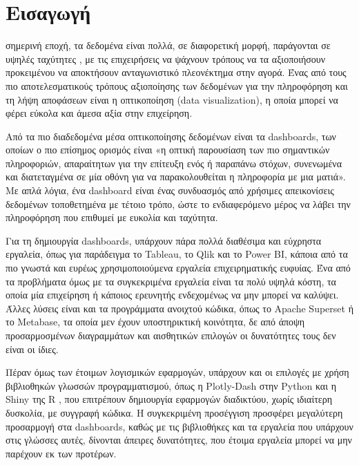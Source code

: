 \documentclass{article}
\begin{document}
\newpage


\section{Εισαγωγή}

 σημερινή εποχή, τα δεδομένα είναι πολλά, σε διαφορετική μορφή, παράγονται σε υψηλές ταχύτητες \cite{laney20013d}, με τις επιχειρήσεις να ψάχνουν τρόπους να τα αξιοποιήσουν προκειμένου να αποκτήσουν ανταγωνιστικό πλεονέκτημα στην αγορά. \cite{ranjan2021big} Ένας από τους πιο αποτελεσματικούς τρόπους αξιοποίησης των δεδομένων για την πληροφόρηση και τη λήψη αποφάσεων είναι η οπτικοποίηση (data visualization), η οποία μπορεί να φέρει εύκολα και άμεσα αξία στην επιχείρηση. \cite{qin2020making}

Από τα πιο διαδεδομένα μέσα οπτικοποίησης δεδομένων είναι τα dashboards, των οποίων ο πιο επίσημος ορισμός είναι «η οπτική παρουσίαση των πιο σημαντικών πληροφοριών, απαραίτητων για την επίτευξη ενός ή παραπάνω στόχων, συνενωμένα και διατεταγμένα σε μία οθόνη για να παρακολουθείται η πληροφορία με μια ματιά». \cite{few2007dashboard} Με απλά λόγια, ένα dashboard είναι ένας συνδυασμός από χρήσιμες απεικονίσεις δεδομένων τοποθετημένα με τέτοιο τρόπο, ώστε το ενδιαφερόμενο μέρος να λάβει την πληροφόρηση που επιθυμεί με ευκολία και ταχύτητα.

Για τη δημιουργία dashboards, υπάρχουν πάρα πολλά διαθέσιμα και εύχρηστα εργαλεία, όπως για παράδειγμα το Tableau, το Qlik και το Power BI, κάποια από τα πιο γνωστά και ευρέως χρησιμοποιούμενα εργαλεία επιχειρηματικής ευφυίας. Ένα από τα προβλήματα όμως με τα συγκεκριμένα εργαλεία είναι τα πολύ υψηλά κόστη, τα οποία μία επιχείρηση ή κάποιος ερευνητής ενδεχομένως να μην μπορεί να καλύψει. Άλλες λύσεις είναι και τα προγράμματα ανοιχτού κώδικα, όπως το Apache Superset ή το Metabase, τα οποία μεν έχουν υποστηρικτική κοινότητα, δε από άποψη προσαρμοσμένων διαγραμμάτων και αισθητικών επιλογών οι δυνατότητες τους δεν είναι οι ίδιες.

Πέραν όμως των έτοιμων λογισμικών εφαρμογών, υπάρχουν και οι επιλογές με χρήση βιβλιοθηκών γλωσσών προγραμματισμού, όπως η Plotly-Dash στην Python \cite{inc2015collaborative} και η Shiny της R \cite{chang2024shiny}, που επιτρέπουν δημιουργία εφαρμογών διαδικτύου, χωρίς ιδιαίτερη δυσκολία, με συγγραφή κώδικα. Η συγκεκριμένη προσέγγιση προσφέρει μεγαλύτερη προσαρμογή στα dashboards, καθώς με τις βιβλιοθήκες και τα εργαλεία που υπάρχουν στις γλώσσες αυτές, δίνονται άπειρες δυνατότητες, που έτοιμα εργαλεία μπορεί να μην παρέχουν εκ των προτέρων.
\end{document}
